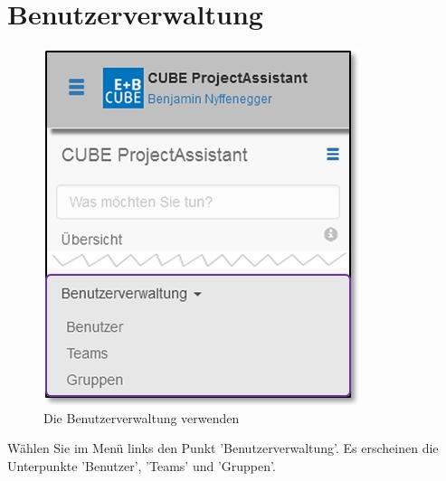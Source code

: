 
\clearpage
\section{Benutzerverwaltung}

\begin{figure}   %
  \vspace{-35pt}      %
  \begin{center}
    \includegraphics[width=1\linewidth]{../chapters/14_Benutzerverwaltung/pictures/14_Menu_Benutzerverwaltung.jpg}
  \end{center}
  \vspace{-20pt}
  \caption{Die Benutzerverwaltung verwenden}
  \vspace{-10pt}
\end{figure}

Wählen Sie im Menü links den Punkt 'Benutzerverwaltung'. Es erscheinen die Unterpunkte 'Benutzer', 'Teams' und 'Gruppen'.

\vspace{\baselineskip}

